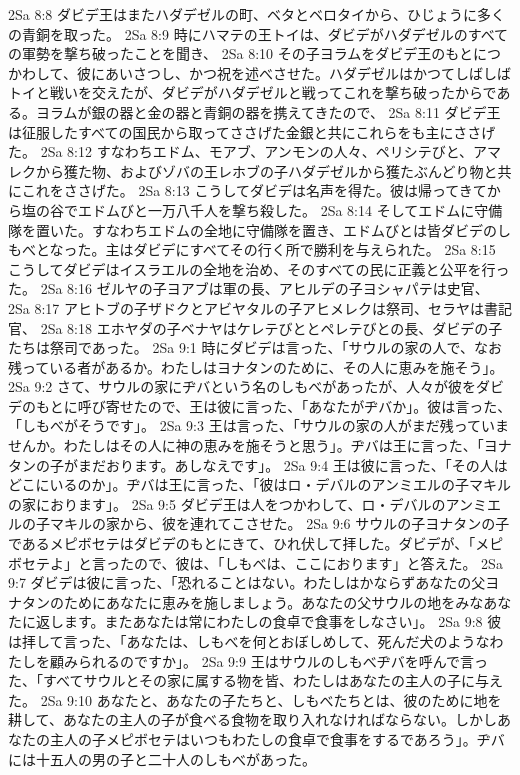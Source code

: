 2Sa 8:8  ダビデ王はまたハダデゼルの町、ベタとベロタイから、ひじょうに多くの青銅を取った。
2Sa 8:9  時にハマテの王トイは、ダビデがハダデゼルのすべての軍勢を撃ち破ったことを聞き、
2Sa 8:10  その子ヨラムをダビデ王のもとにつかわして、彼にあいさつし、かつ祝を述べさせた。ハダデゼルはかつてしばしばトイと戦いを交えたが、ダビデがハダデゼルと戦ってこれを撃ち破ったからである。ヨラムが銀の器と金の器と青銅の器を携えてきたので、
2Sa 8:11  ダビデ王は征服したすべての国民から取ってささげた金銀と共にこれらをも主にささげた。
2Sa 8:12  すなわちエドム、モアブ、アンモンの人々、ペリシテびと、アマレクから獲た物、およびゾバの王レホブの子ハダデゼルから獲たぶんどり物と共にこれをささげた。
2Sa 8:13  こうしてダビデは名声を得た。彼は帰ってきてから塩の谷でエドムびと一万八千人を撃ち殺した。
2Sa 8:14  そしてエドムに守備隊を置いた。すなわちエドムの全地に守備隊を置き、エドムびとは皆ダビデのしもべとなった。主はダビデにすべてその行く所で勝利を与えられた。
2Sa 8:15  こうしてダビデはイスラエルの全地を治め、そのすべての民に正義と公平を行った。
2Sa 8:16  ゼルヤの子ヨアブは軍の長、アヒルデの子ヨシャパテは史官、
2Sa 8:17  アヒトブの子ザドクとアビヤタルの子アヒメレクは祭司、セラヤは書記官、
2Sa 8:18  エホヤダの子ベナヤはケレテびととペレテびとの長、ダビデの子たちは祭司であった。
2Sa 9:1  時にダビデは言った、「サウルの家の人で、なお残っている者があるか。わたしはヨナタンのために、その人に恵みを施そう」。
2Sa 9:2  さて、サウルの家にヂバという名のしもべがあったが、人々が彼をダビデのもとに呼び寄せたので、王は彼に言った、「あなたがヂバか」。彼は言った、「しもべがそうです」。
2Sa 9:3  王は言った、「サウルの家の人がまだ残っていませんか。わたしはその人に神の恵みを施そうと思う」。ヂバは王に言った、「ヨナタンの子がまだおります。あしなえです」。
2Sa 9:4  王は彼に言った、「その人はどこにいるのか」。ヂバは王に言った、「彼はロ・デバルのアンミエルの子マキルの家におります」。
2Sa 9:5  ダビデ王は人をつかわして、ロ・デバルのアンミエルの子マキルの家から、彼を連れてこさせた。
2Sa 9:6  サウルの子ヨナタンの子であるメピボセテはダビデのもとにきて、ひれ伏して拝した。ダビデが、「メピボセテよ」と言ったので、彼は、「しもべは、ここにおります」と答えた。
2Sa 9:7  ダビデは彼に言った、「恐れることはない。わたしはかならずあなたの父ヨナタンのためにあなたに恵みを施しましょう。あなたの父サウルの地をみなあなたに返します。またあなたは常にわたしの食卓で食事をしなさい」。
2Sa 9:8  彼は拝して言った、「あなたは、しもべを何とおぼしめして、死んだ犬のようなわたしを顧みられるのですか」。
2Sa 9:9  王はサウルのしもべヂバを呼んで言った、「すべてサウルとその家に属する物を皆、わたしはあなたの主人の子に与えた。
2Sa 9:10  あなたと、あなたの子たちと、しもべたちとは、彼のために地を耕して、あなたの主人の子が食べる食物を取り入れなければならない。しかしあなたの主人の子メピボセテはいつもわたしの食卓で食事をするであろう」。ヂバには十五人の男の子と二十人のしもべがあった。
